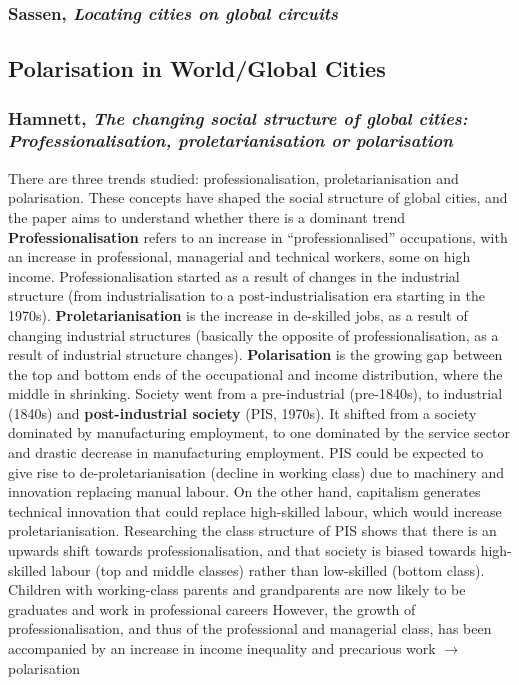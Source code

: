 \documentclass{article}
\begin{document}
\subsubsection{Sassen, \textit{Locating cities on global circuits}}

\begin{outline}
	\1
\end{outline}

\subsection{Polarisation in World/Global Cities}

\subsubsection{Hamnett, \textit{The changing social structure of global cities: Professionalisation, proletarianisation or polarisation}}

\begin{outline}
	\1 There are three trends studied: professionalisation, proletarianisation and polarisation. These concepts have shaped the social structure of global cities, and the paper aims to understand whether there is a dominant trend
	\1 \textbf{Professionalisation} refers to an increase in ``professionalised'' occupations, with an increase in professional, managerial and technical workers, some on high income. Professionalisation started as a result of changes in the industrial structure (from industrialisation to a post-industrialisation era starting in the 1970s).
	\1 \textbf{Proletarianisation} is the increase in de-skilled jobs, as a result of changing industrial structures (basically the opposite of professionalisation, as a result of industrial structure changes).
	\1 \textbf{Polarisation} is the growing gap between the top and bottom ends of the occupational and income distribution, where the middle in shrinking.
	\1 Society went from a pre-industrial (pre-1840s), to industrial (1840s) and \textbf{post-industrial society} (PIS, 1970s). 
		\2 It shifted from a society dominated by manufacturing employment, to one dominated by the service sector and drastic decrease in manufacturing employment. PIS could be expected to give rise to de-proletarianisation (decline in working class) due to machinery and innovation replacing manual labour. On the other hand, capitalism generates technical innovation that could replace high-skilled labour, which would increase proletarianisation.
		\2 Researching the class structure of PIS shows that there is an upwards shift towards professionalisation, and that society is biased towards high-skilled labour (top and middle classes) rather than low-skilled (bottom class). Children with working-class parents and grandparents are now likely to be graduates and work in professional careers
		\2 However, the growth of professionalisation, and thus of the professional and managerial class, has been accompanied by an increase in income inequality and precarious work $\rightarrow$ polarisation
 \end{outline}
\end{document}
